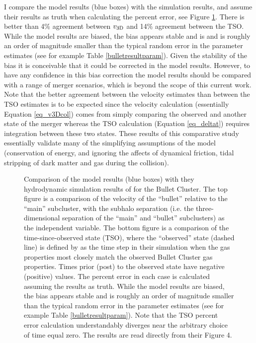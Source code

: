 \documentclass[12pt]{emulateapj}
\begin{document}
I compare the model results (blue boxes) with the \citet{Springel:2007bg} simulation results, and assume their results as truth when calculating the percent error, see Figure \ref{fig_SFcomparison}.
There is better than 4\% agreement between $v_{\rm 3D}$ and 14\% agreement between the TSO.
While the model results are biased, the bias appears stable and is and is roughly an order of magnitude smaller than the typical random error in the parameter estimates (see for example Table \ref{bulletresultparam}).
Given the stability of the bias it is conceivable that it could be corrected in the model results.
However, to have any confidence in this bias correction the model results should be compared with a range of merger scenarios, which is beyond the scope of this current work.
Note that the better agreement between the velocity estimates than between the TSO estimates is to be expected since the velocity calculation (essentially Equation \ref{eq_v3Dcol}) comes from simply comparing the observed and another state of the merger whereas the TSO calculation (Equation \ref{eq_deltat}) requires integration between these two states.
These results of this comparative study essentially validate many of the simplifying assumptions of the model (conservation of energy, and ignoring the affects of dynamical friction, tidal stripping of dark matter and gas during the collision).

\begin{figure}
\caption{
Comparison of the model results (blue boxes) with they hydrodynamic simulation results of \citet[black circles;][]{Springel:2007bg} for the Bullet Cluster.  
The top figure is a comparison of the velocity of the ``bullet'' relative to the ``main'' subcluster, with the subhalo separation (i.e. the three-dimensional separation of the ``main'' and ``bullet'' subclusters) as the independent variable.  
The bottom figure is a comparison of the time-since-observed state (TSO), where the ``observed'' state (dashed line) is defined by \citet{Springel:2007bg} as the time step in their simulation when the gas properties most closely match the observed Bullet Cluster gas properties.
Times prior (post) to the observed state have negative (positive) values.  
The percent error in each case is calculated assuming the \citet{Springel:2007bg} results as truth.  
While the model results are biased, the bias appears stable and is roughly an order of magnitude smaller than the typical random error in the parameter estimates (see for example Table \ref{bulletresultparam}).  
Note that the TSO percent error calculation understandably diverges near the arbitrary choice of time equal zero. 
The \citet{Springel:2007bg} results are read directly from their Figure 4.
\label{fig_SFcomparison}}
\end{figure}
\end{document}
